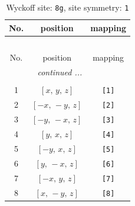 \documentclass[fleqn,8pt]{jsarticle}
\begin{document}
\renewcommand{\arraystretch}{1.2}
\begin{longtable}{ccc}
\caption{Wyckoff site: {\tt 8g}, site symmetry: {\tt 1}}
 \\
 \hline \hline
No. & position & mapping \\ \hline \endfirsthead

\multicolumn{2}{l}{\tablename\ \thetable{}} \\
 \hline \hline
No. & position & mapping \\ \hline \endhead

 \hline \hline
\multicolumn{2}{r}{\footnotesize\it continued ...} \\ \endfoot

 \hline \hline
\multicolumn{2}{r}{} \\ \endlastfoot

1 & $\left[ x,\, y,\, z \right]$ & {\tt [1]} \\ \hline
2 & $\left[ - x,\, - y,\, z \right]$ & {\tt [2]} \\ \hline
3 & $\left[ - y,\, - x,\, z \right]$ & {\tt [3]} \\ \hline
4 & $\left[ y,\, x,\, z \right]$ & {\tt [4]} \\ \hline
5 & $\left[ - y,\, x,\, z \right]$ & {\tt [5]} \\ \hline
6 & $\left[ y,\, - x,\, z \right]$ & {\tt [6]} \\ \hline
7 & $\left[ - x,\, y,\, z \right]$ & {\tt [7]} \\ \hline
8 & $\left[ x,\, - y,\, z \right]$ & {\tt [8]} \\
\end{longtable}
\end{document}
